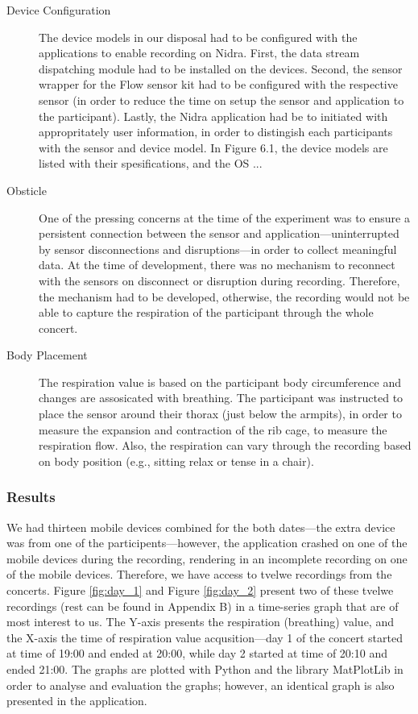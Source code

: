 \begin{description}
    \item[Device Configuration] The device models in our disposal had to be configured with the applications to enable recording on Nidra. First, the data stream dispatching module had to be installed on the devices. Second, the sensor wrapper for the Flow sensor kit had to be configured with the respective sensor (in order to reduce the time on setup the sensor and application to the participant). Lastly, the Nidra application had be to initiated with appropritately user information, in order to distingish each participants with the sensor and device model. In Figure 6.1, the device models are listed with their spesifications, and the OS ...
    \item[Obsticle] One of the pressing concerns at the time of the experiment was to ensure a persistent connection between the sensor and application---uninterrupted by sensor disconnections and disruptions---in order to collect meaningful data.  At the time of development, there was no mechanism to reconnect with the sensors on disconnect or disruption during recording. Therefore, the mechanism had to be developed, otherwise, the recording would not be able to capture the respiration of the participant through the whole concert. 
    \item[Body Placement] The respiration value is based on the participant body circumference and changes are assosicated with breathing. The participant was instructed to place the sensor around their thorax (just below the armpits), in order to measure the expansion and contraction of the rib cage, to measure the respiration flow. Also, the respiration can vary through the recording based on body position (e.g., sitting relax or tense in a chair). 

\end{description}


\subsubsection{Results}

We had thirteen mobile devices combined for the both dates---the extra device was from one of the participents---however, the application crashed on one of the mobile devices during the recording, rendering  in an incomplete recording on one of the mobile devices. Therefore, we have access to tvelwe recordings from the concerts. Figure \ref{fig:day_1} and Figure \ref{fig:day_2} present two of these tvelwe recordings (rest can be found in Appendix B) in a time-series graph that are of most interest to us. The Y-axis presents the respiration (breathing) value, and the X-axis the time of respiration value acqusition---day 1 of the concert started at time of 19:00 and ended at 20:00, while day 2 started at time of 20:10 and ended 21:00. The graphs are plotted with Python and the library MatPlotLib in order to analyse and evaluation the graphs; however, an identical graph is also presented in the application.


